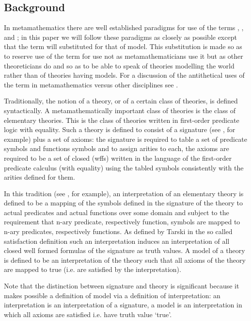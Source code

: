 \subsection{Background}
\note  In metamathematics there are well established paradigms for use of the terms
, ,  and ;
in this paper  we will follow these paradigms as closely as possible except that the term  will substituted  for that of model. 
This substitution is made so as to reserve use of the term  for  use not as metamathematicians 
use it but as other theoreticians do and so as to be able to speak of theories modelling 
the world rather than of theories having models. For a discussion of the antithetical uses of the term 
 in metamathematics versus other disciplines see \cite{HodgesModelTheory}.

Traditionally, the notion of a theory, or of a certain class of theories, is  defined syntactically.
A metamathematically important class of theories  is the class of elementary theories. 
This is the class of theories written in first-order predicate logic with equality. 
Such a theory is defined to consist of a signature (see \cite{HodgesModelTheory}, for example) plus a set of axioms: 
the signature is required to table a set of predicate symbols and functions symbols and to assign arities to each, 
the axioms are required  to be a set of closed  (wffs) written
in the language of the first-order predicate calculus (with equality)
using the tabled  symbols  consistently with the arities defined for them. 

\note In this tradition (see \cite{Mendelson}, for example), an interpretation of an elementary theory is defined to be a mapping of the symbols defined in the signature 
of the theory to actual predicates and actual functions over some domain and subject to the requirement that n-ary predicate, respectively function, symbols are mapped to n-ary predicates, respectively functions.
As defined by Tarski in the so called satisfaction definition
such an interpretation induces an interpretation of all
closed well formed formulas of the signature as truth values. 
A model of a theory is defined to be an interpretation of the theory such that all axioms of the theory are mapped to true (i.e. are satisfied by the interpretation). 

\note
Note that the distinction between signature and theory is significant because it makes possible a definition of model 
via a definition of interpretation: an interpretation is an interpretation of a signature, 
a model is an interpretation in which all axioms are satisfied i.e. have truth value `true'.   



